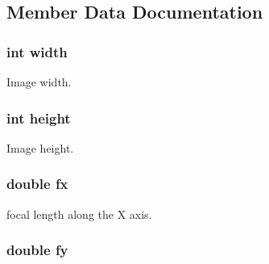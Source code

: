 \subsection{Member Data Documentation}
\hypertarget{structfovis_1_1CameraIntrinsicsParameters_a2474a5474cbff19523a51eb1de01cda4}{
\subsubsection[{width}]{\setlength{\rightskip}{0pt plus 5cm}int {\bf width}}}
\label{structfovis_1_1CameraIntrinsicsParameters_a2474a5474cbff19523a51eb1de01cda4}
Image width. \hypertarget{structfovis_1_1CameraIntrinsicsParameters_ad12fc34ce789bce6c8a05d8a17138534}{
\subsubsection[{height}]{\setlength{\rightskip}{0pt plus 5cm}int {\bf height}}}
\label{structfovis_1_1CameraIntrinsicsParameters_ad12fc34ce789bce6c8a05d8a17138534}
Image height. \hypertarget{structfovis_1_1CameraIntrinsicsParameters_aa7e88347476ef454086e7c3cd9865460}{
\subsubsection[{fx}]{\setlength{\rightskip}{0pt plus 5cm}double {\bf fx}}}
\label{structfovis_1_1CameraIntrinsicsParameters_aa7e88347476ef454086e7c3cd9865460}
focal length along the X axis. \hypertarget{structfovis_1_1CameraIntrinsicsParameters_a03c4ce20c7e4b8c6d60a20b833be69fe}{
\subsubsection[{fy}]{\setlength{\rightskip}{0pt plus 5cm}double {\bf fy}}}
\label{structfovis_1_1CameraIntrinsicsParameters_a03c4ce20c7e4b8c6d60a20b833be69fe}
